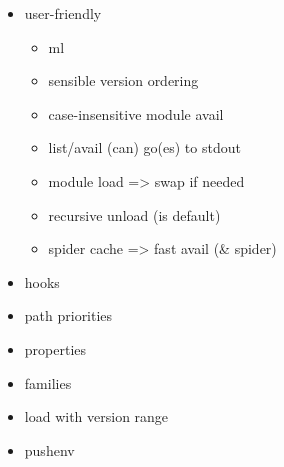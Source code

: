\begin{itemize}
    \item user-friendly
    \begin{itemize}
        \item ml
        \item sensible version ordering
        \item case-insensitive module avail
        \item list/avail (can) go(es) to stdout
        \item module load => swap if needed
        \item recursive unload (is default)
        \item spider cache => fast avail (\& spider)
    \end{itemize}
    \item hooks
    \item path priorities
    \item properties
    \item families
    \item load with version range
    \item pushenv
\end{itemize}
